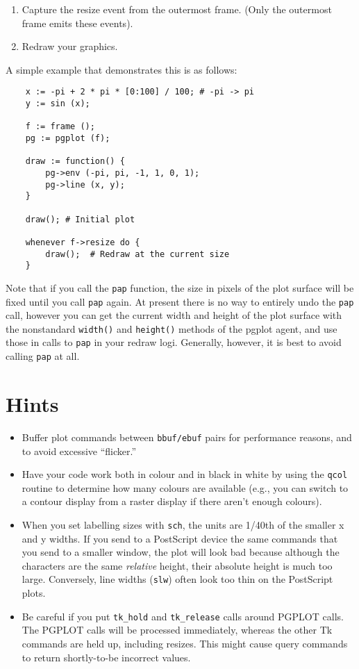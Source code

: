 \begin{enumerate}
\item Capture the resize event from the outermost frame.  (Only the
      outermost frame emits these events).
\item Redraw your graphics.
\end{enumerate}

A simple example that demonstrates this is as follows:

\begin{verbatim}
    x := -pi + 2 * pi * [0:100] / 100; # -pi -> pi
    y := sin (x);

    f := frame ();
    pg := pgplot (f);

    draw := function() {
        pg->env (-pi, pi, -1, 1, 0, 1);
        pg->line (x, y);
    }

    draw(); # Initial plot

    whenever f->resize do {
        draw();  # Redraw at the current size
    }
\end{verbatim}

Note that if you call the {\tt pap} function, the size in pixels of
the plot surface will be fixed until you call {\tt pap} again. At
present there is no way to entirely undo the {\tt pap} call, however
you can get the current width and height of the plot surface with the
nonstandard {\tt width()} and {\tt height()} methods of the pgplot
agent, and use those in calls to {\tt pap} in your redraw
logi. Generally, however,  it is best to avoid calling {\tt pap} at all.


\section{Hints}

\begin{itemize}
\item Buffer plot commands between {\tt bbuf/ebuf} pairs for
      performance reasons, and to avoid excessive ``flicker.''
\item Have your code work both in colour and in black in white by
      using the {\tt qcol} routine to determine how many colours are
      available (e.g., you can switch to a contour display from a
      raster display if there aren't enough colours).
\item When you set labelling sizes with {\tt sch}, the units are 1/40th
      of the smaller x and y widths.  If you send to a
      PostScript device the same commands that you send to a
      smaller window, the plot will look bad because although the
      characters are the same {\em relative} height, their absolute
      height is much too large.  Conversely, line widths ({\tt slw})
      often look too thin on the PostScript plots.
\item Be careful if you put {\tt tk\_hold} and {\tt tk\_release} calls around 
      PGPLOT calls. The PGPLOT calls will be processed immediately, whereas the
      other Tk commands are held up, including resizes. This might cause
      query commands to return shortly-to-be incorrect values.
\end{itemize}

